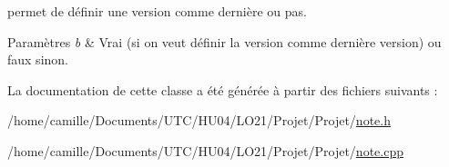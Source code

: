 permet de définir une version comme dernière ou pas. 


\begin{DoxyParams}{Paramètres}
{\em b} & Vrai (si on veut définir la version comme dernière version) ou faux sinon. \\
\hline
\end{DoxyParams}


La documentation de cette classe a été générée à partir des fichiers suivants \-:\begin{DoxyCompactItemize}
\item 
/home/camille/\-Documents/\-U\-T\-C/\-H\-U04/\-L\-O21/\-Projet/\-Projet/\hyperlink{note_8h}{note.\-h}\item 
/home/camille/\-Documents/\-U\-T\-C/\-H\-U04/\-L\-O21/\-Projet/\-Projet/\hyperlink{note_8cpp}{note.\-cpp}\end{DoxyCompactItemize}
